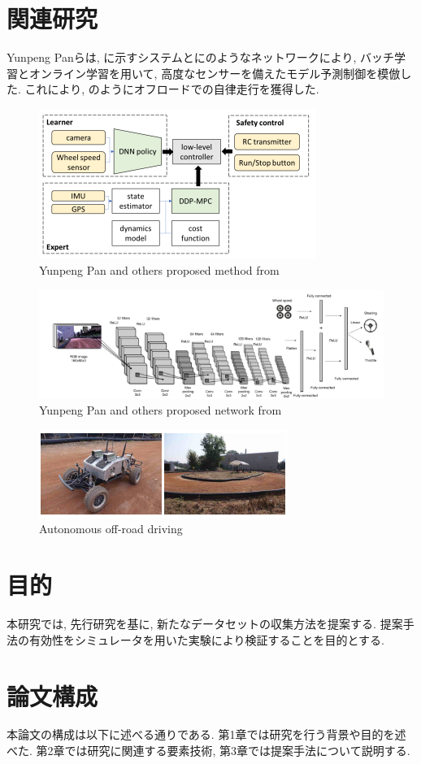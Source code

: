 \newpage
\section{関連研究}
Yunpeng Pan\cite{batch}らは, に示すシステムとにのようなネットワークにより, バッチ学習とオンライン学習を用いて, 高度なセンサーを備えたモデル予測制御を模倣した. これにより, のようにオフロードでの自律走行を獲得した. 

\begin{figure}[h]
     \centering
     \includegraphics[keepaspectratio, scale=0.7]{images/batch1.png}
     \caption{Yunpeng Pan and others proposed method from \cite{batch}}
     \label{Fig:batch1}
     \end{figure}

\begin{figure}[h]
     \centering
     \includegraphics[keepaspectratio, scale=0.5]{images/net.png}
     \caption{Yunpeng Pan and others proposed network from \cite{net}}
     \label{Fig:net}
     \end{figure}

\begin{figure}[h]
     \centering
     \includegraphics[keepaspectratio, scale=0.7]{images/batch2.png}
     \caption{Autonomous off-road driving}
     \label{Fig:batch2}
     \end{figure}


\newpage
\section{目的}
本研究では, 先行研究を基に, 新たなデータセットの収集方法を提案する. 提案手法の有効性をシミュレータを用いた実験により検証することを目的とする. 

\section{論文構成}
本論文の構成は以下に述べる通りである. 第1章では研究を行う背景や目的を述べた. 第2章では研究に関連する要素技術, 第3章では提案手法について説明する. 
     
